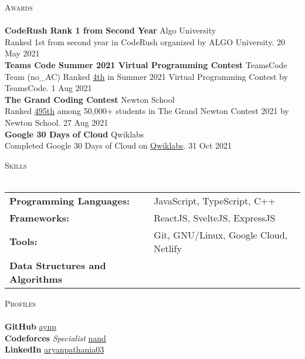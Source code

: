 \documentclass[a4paper]{article}
\newcommand{\lineunder} {
    \vspace*{-8pt} \\
    \hspace*{-18pt} \hrulefill \\
}
\newcommand{\header} [1] {
    {\hspace*{-18pt}\vspace*{6pt} \textsc{#1}}
    \vspace*{-6pt} \lineunder
}
\begin{document}
\header{Awards}
\vspace{1mm}
\textbf{CodeRush Rank 1 from Second Year} \hfill Algo University\\
Ranked 1st from second year in CodeRush organized by ALGO University. \hfill 20 May 2021\\
\vspace*{2mm}
\textbf{Teams Code Summer 2021 Virtual Programming Contest} \hfill TeamsCode\\
Team (no\_AC) Ranked \href{https://youtu.be/eCylTCHctY0?t=16137}{4th} in Summer 2021 Virtual Programming Contest by TeamsCode. \hfill 1 Aug 2021\\
\vspace*{2mm}
\textbf{The Grand Coding Contest} \hfill Newton School\\
Ranked \href{https://www.linkedin.com/posts/aryanpathania03_aryan-has-secured-rank-495-in-newtons-grand-activity-6841777869484642304-YhKD}{495th} among 50,000+ students in The Grand Newton Contest 2021 by Newton School. \hfill 27 Aug 2021\\
\vspace*{2mm}
\textbf{Google 30 Days of Cloud} \hfill Qwiklabs\\
Completed Google 30 Days of Cloud on \href{https://www.qwiklabs.com/public_profiles/4c78c6d8-ad43-4991-b8fe-03e559c1bac5}{Qwiklabs}. \hfill 31 Oct 2021\\
\vspace*{2mm}

\header{Skills}
\vspace{1mm}
\begin{tabular}{ l l }
	\textbf{Programming Languages:}          & JavaScript, TypeScript, C++               \\
	\textbf{Frameworks:}                     & ReactJS, SvelteJS, ExpressJS              \\
	\textbf{Tools:}                          & Git, GNU/Linux, Google Cloud, Netlify \\
	\textbf{Data Structures and Algorithms} &                                            \\
\end{tabular}
\vspace{2mm}


\header{Profiles}
\vspace{1mm}
{\textbf{GitHub}} \hfill \href{https://www.github.com/aynp}{aynp}\\
\vspace*{2mm}
{\textbf{Codeforces}} {\sl Specialist}  \hfill \href{https://codeforces.com/profile/nand}{nand}\\
\vspace*{2mm}
{\textbf{LinkedIn}} \hfill \href{https://www.linkedin.com/in/aryanpathania03/}{aryanpathania03}\\
\
\end{document}
